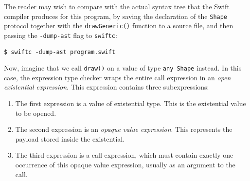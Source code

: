 \documentclass[../generics]{subfiles}
\begin{document}
\begin{example}
The reader may wish to compare  with the actual syntax tree that the Swift compiler produces for this program, by saving the declaration of the \texttt{Shape} protocol together with the \texttt{drawGeneric()} function to a source file, and then passing the \texttt{-dump-ast} flag to \texttt{swiftc}:
\begin{Verbatim}
$ swiftc -dump-ast program.swift
\end{Verbatim}
\end{example}

Now, imagine that we call \texttt{draw()} on a value of type \texttt{any~Shape} instead. In this case, the expression type checker wraps the entire call expression in an \emph{open existential expression}. This expression contains three subexpressions:
\begin{enumerate}
\item The first expression is a value of existential type. This is the existential value to be opened.
\item The second expression is an \emph{opaque value expression}. This represents the payload stored inside the existential.
\item The third expression is a call expression, which must contain exactly one occurrence of this opaque value expression, usually as an argument to the call.
\end{enumerate}
\end{document}
